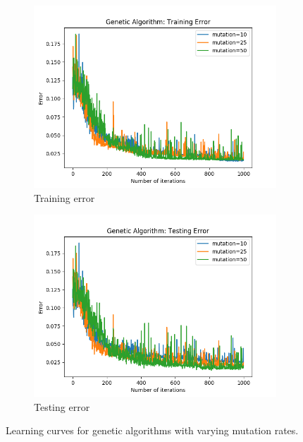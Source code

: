 \documentclass{article}
\begin{document}
        \begin{figure}[htb]
        \centering

        \begin{subfigure}{0.5\textwidth}
          \includegraphics[width=\linewidth]{out/ga/mutation-training.png}
          \caption{Training error}
          \label{fig:ga-mutation-1}
        \end{subfigure}\hfil
        \begin{subfigure}{0.5\textwidth}
          \includegraphics[width=\linewidth]{out/ga/mutation-testing.png}
          \caption{Testing error}
          \label{fig:ga-mutation-2}
        \end{subfigure}

        \caption{Learning curves for genetic algorithms with varying mutation rates.}
        \label{fig:ga-mutation}
        \end{figure}
\end{document}
